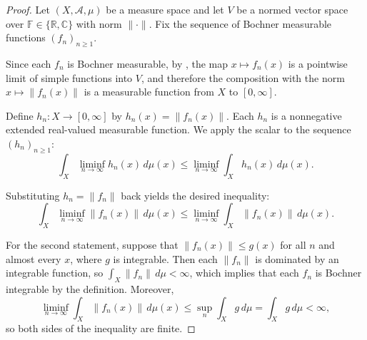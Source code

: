 \begin{proof}
Let $(X, \mathcal{A}, \mu)$ be a measure space and let $V$ be a normed vector space over $\mathbb{F} \in \{\mathbb{R}, \mathbb{C}\}$ with norm $\|\cdot\|$. Fix the sequence of Bochner measurable functions $(f_n)_{n \geq 1}$.

Since each $f_n$ is Bochner measurable, by , the map $x \mapsto f_n(x)$ is a pointwise limit of simple functions into $V$, and therefore the composition with the norm $x \mapsto \|f_n(x)\|$ is a measurable function from $X$ to $[0, \infty]$.

Define $h_n : X \to [0, \infty]$ by $h_n(x) = \|f_n(x)\|$. Each $h_n$ is a nonnegative extended real-valued measurable function. We apply the scalar  to the sequence $(h_n)_{n \geq 1}$:
$$\int_X \liminf_{n \to \infty} h_n(x)\,d\mu(x) \leq \liminf_{n \to \infty} \int_X h_n(x)\,d\mu(x).$$

Substituting $h_n = \|f_n\|$ back yields the desired inequality:
$$\int_X \liminf_{n \to \infty} \|f_n(x)\|\,d\mu(x) \leq \liminf_{n \to \infty} \int_X \|f_n(x)\|\,d\mu(x).$$

For the second statement, suppose that $\|f_n(x)\| \leq g(x)$ for all $n$ and almost every $x$, where $g$ is integrable. Then each $\|f_n\|$ is dominated by an integrable function, so $\int_X \|f_n\|\,d\mu < \infty$, which implies that each $f_n$ is Bochner integrable by the definition. Moreover,
$$\liminf_{n \to \infty} \int_X \|f_n(x)\|\,d\mu(x) \leq \sup_{n} \int_X g\,d\mu = \int_X g\,d\mu < \infty,$$
so both sides of the inequality are finite.
\end{proof}